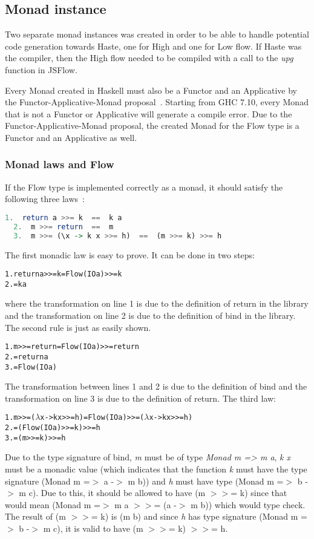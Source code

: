 \subsection{Monad instance}
Two separate monad instances was created in order to be able to handle potential code generation towards Haste, one for High and one for Low flow. If Haste was the compiler, then the High flow needed to be compiled with a call to the \emph{upg} function in JSFlow.

Every Monad created in Haskell must also be a Functor and an Applicative by the Functor-Applicative-Monad proposal~\cite{functor_applicative_monad}. Starting from GHC 7.10, every Monad that is not a Functor or Applicative will generate a compile error. Due to the Functor-Applicative-Monad proposal, the created Monad for the Flow type is a Functor and an Applicative as well.
\subsubsection{Monad laws and Flow}
If the Flow type is implemented correctly as a monad, it should satisfy the following three laws~\cite{functor-monad-law}:
\begin{lstlisting}[language=Haskell]
  1.  return a >>= k  ==  k a
  2.  m >>= return  ==  m
  3.  m >>= (\x -> k x >>= h)  ==  (m >>= k) >>= h
\end{lstlisting}
The first monadic law is easy to prove. It can be done in two steps:
\begin{alltt}
  1. return a >>= k = Flow (IO a) >>= k
  2.                = k a
\end{alltt}
where the transformation on line 1 is due to the definition of return in the library and the transformation on line 2 is due to the definition of bind in the library.
\newline
\newline
The second rule is just as easily shown.
\begin{alltt}
  1. m >>= return = Flow (IO a) >>= return
  2.              = return a
  3.              = Flow (IO a)
\end{alltt}
The transformation between lines 1 and 2 is due to the definition of bind and the transformation on line 3 is due to the definition of return.
\newline
\newline
The third law:
\begin{alltt}
  1. m >>= (\(\lambda\)x -> k x >>= h) = Flow (IO a) >>= (\(\lambda\)x -> k x >>= h)
  2.                                   = (Flow (IO a) >>= k) >>= h
  3.                                   = (m >>= k) >>= h
\end{alltt}
Due to the type signature of bind, \emph{m} must be of type \emph{Monad m => m a}, \emph{k x} must be a monadic value (which indicates that the function \emph{k} must have the type signature (Monad m =\(>\) a -\(>\) m b)) and \emph{h} must have type (Monad m =\(>\) b -\(>\) m c). Due to this, it should be allowed to have (m \(>>\)= k) since that would mean (Monad m =\(>\) m a \(>>\)= (a -\(>\) m b)) which would type check. The result of (m \(>>\)= k) is (m b) and since \emph{h} has type signature (Monad m =\(>\) b -\(>\) m c), it is valid to have (m \(>>\)= k) \(>>\)= h.
